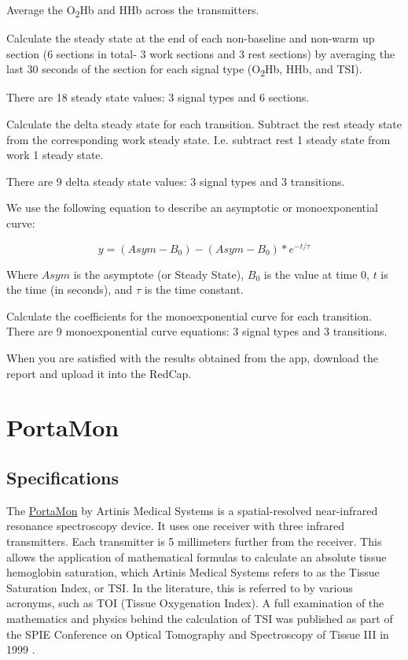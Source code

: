 \documentclass[
]{book}
\begin{document}
Average the O\textsubscript{2}Hb and HHb across the transmitters.

Calculate the steady state at the end of each non-baseline and non-warm up section (6 sections in total- 3 work sections and 3 rest sections) by averaging the last 30 seconds of the section for each signal type (O\textsubscript{2}Hb, HHb, and TSI).

There are 18 steady state values: 3 signal types and 6 sections.

Calculate the delta steady state for each transition.
Subtract the rest steady state from the corresponding work steady state. I.e. subtract rest 1 steady state from work 1 steady state.

There are 9 delta steady state values: 3 signal types and 3 transitions.

We use the following equation to describe an asymptotic or monoexponential curve:

\[y =({Asym}-B_0) - ({Asym}-B_0)*e^{-t/ \tau} \]

Where \({Asym}\) is the asymptote (or Steady State), \(B_0\) is the value at time 0, \(t\) is the time (in seconds), and \(\tau\) is the time constant.

Calculate the coefficients for the monoexponential curve for each transition. There are 9 monoexponential curve equations: 3 signal types and 3 transitions.

When you are satisfied with the results obtained from the app, download the report and upload it into the RedCap.

\hypertarget{appendix-appendix}{%
\appendix}


\hypertarget{PortaMon}{%
\chapter{PortaMon}\label{PortaMon}}

\hypertarget{PortaMon-Specs}{%
\section{Specifications}\label{PortaMon-Specs}}

The \href{https://www.artinis.com/portamon}{PortaMon} by Artinis Medical Systems is a spatial-resolved near-infrared resonance spectroscopy device. It uses one receiver with three infrared transmitters. Each transmitter is 5 millimeters further from the receiver. This allows the application of mathematical formulas to calculate an absolute tissue hemoglobin saturation, which Artinis Medical Systems refers to as the Tissue Saturation Index, or TSI. In the literature, this is referred to by various acronyms, such as TOI (Tissue Oxygenation Index). A full examination of the mathematics and physics behind the calculation of TSI was published as part of the SPIE Conference on Optical Tomography and Spectroscopy of Tissue III in 1999 \citep{Suzuki1999TissueOM}.
\end{document}
